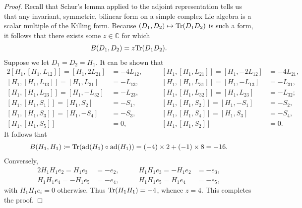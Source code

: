 \noindent\begin{proof} Recall that Schur's lemma applied to the adjoint representation tells us that any invariant, symmetric, bilinear form on a simple complex Lie algebra is a scalar multiple of the Killing form. Because $(D_1, D_2) \mapsto \textup{Tr}(D_1D_2)$ is such a form, it follows that there exists some $z \in \mathbb{C}$ for which
\begin{align*}
\begin{split}
B(D_1, D_2) = z\textup{Tr}(D_1D_2).
\end{split}
\end{align*}
\noindent Suppose we let $D_1 = D_2 = H_1$. It can be shown that
\begin{alignat*}{2}
[H_1, [H_1, L_{12}]] = [H_1, 2L_{21}] &= -4L_{12},&\qquad[H_1, [H_1, L_{21}]] = [H_1, -2L_{12}] &= -4L_{21},\\
[H_1, [H_1, L_{13}]] = [H_1, L_{31}] &= -L_{13},&\qquad[H_1, [H_1, L_{31}]] = [H_1, -L_{13}] &= -L_{31},\\
[H_1, [H_1, L_{23}]] = [H_1, -L_{32}] &= -L_{23},&\qquad[H_1, [H_1, L_{32}]] = [H_1, L_{23}] &= -L_{32};\\
[H_1, [H_1, S_1]] = [H_1, S_2] &= -S_1,&\qquad[H_1, [H_1, S_2]] = [H_1, -S_1] &= -S_2,\\
[H_1, [H_1, S_3]] = [H_1, -S_4] &= -S_3,&\qquad[H_1, [H_1, S_4]] = [H_1, S_3] &= -S_4,\\
[H_1, [H_1, S_5]] &= 0,&\qquad[H_1, [H_1, S_2]] &= 0.
\end{alignat*}
\noindent It follows that
\begin{align*}
\begin{split}
B(H_1, H_1) \coloneqq \textup{Tr}(\textup{ad}(H_1) \circ \textup{ad}(H_1)) = (-4) \times 2 + (-1) \times 8 = -16.
\end{split}
\end{align*}
\noindent Conversely,
\begin{alignat*}{2}
H_1H_1e_2 = H_1e_3 &= -e_2,&\qquad H_1H_1e_3 = -H_1e_2 &= -e_3,\\
H_1H_1e_4 = -H_1e_5 &= -e_4,&\qquad H_1H_1e_5 = H_1e_4 &= -e_5,
\end{alignat*}
\noindent with $H_1H_1e_i = 0$ otherwise. Thus $\textup{Tr}(H_1H_1) = -4$, whence $z = 4$. This completes the proof.
\end{proof}\\

